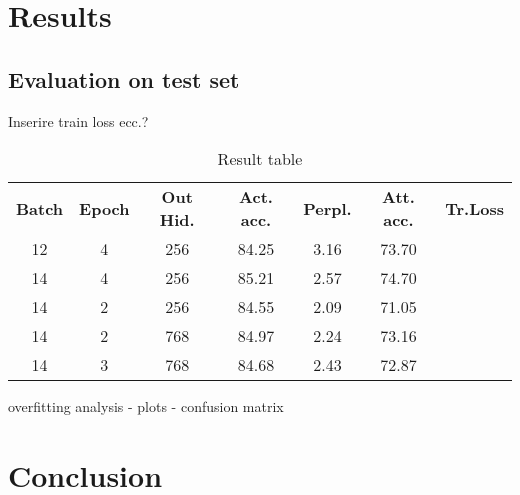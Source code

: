 \documentclass[final]{cvpr}
\begin{document}
	\section{Results}
	
	\subsection{Evaluation on test set}
	Inserire train loss ecc.?
	
	\begin{table}[h]
		\centering
	
		\begin{tabular}{ccccccc}
			\rowcolor[gray]{0.5}
			\textbf{Batch} & \textbf{Epoch} & \textbf{Out Hid.} & \textbf{Act. acc.} & \textbf{Perpl.} & \textbf{Att. acc.} & \textbf{Tr.Loss} \\
			\rowcolor[gray]{0.9}
			12 & 4 & 256 & 84.25 & 3.16 & 73.70 & \\
			\rowcolor[gray]{0.97}
			14 & 4 & 256 & 85.21 & 2.57 & 74.70 & \\
			\rowcolor[gray]{0.9}
			14 & 2 & 256 & 84.55 & 2.09 & 71.05 & \\
			\rowcolor[gray]{0.97}
			14 & 2 & 768 & 84.97 & 2.24 & 73.16 & \\
			\rowcolor[gray]{0.9}
			14 & 3 & 768 & 84.68 & 2.43 & 72.87 & \\
		\end{tabular}
	
		\caption{\small{Result table}}
		\label{tab:sentcomp}
	\end{table}

	overfitting analysis - plots - confusion matrix
	\section{Conclusion}
	
	
	{\small
		
		
	}
	
\end{document}
